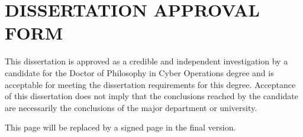 \chapter*{\Large \uppercase{Dissertation Approval Form}}
\label{chap:Approval}

This dissertation is approved as a credible and independent investigation by a candidate for the Doctor of Philosophy in Cyber Operations degree and is acceptable for meeting the dissertation requirements for this degree. Acceptance of this dissertation does not imply that the conclusions reached by the candidate are necessarily the conclusions of the major department or university.

This page will be replaced by a signed page in the final version.